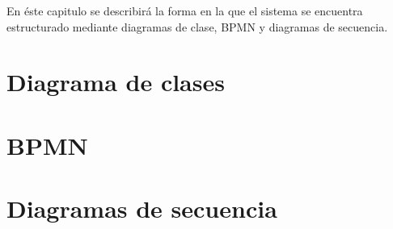

En \'este capitulo se describir\'a la forma en la que el sistema se encuentra estructurado mediante diagramas de clase, BPMN y diagramas de secuencia.
\section{Diagrama de clases}
\section{BPMN}
\section{Diagramas de secuencia}

